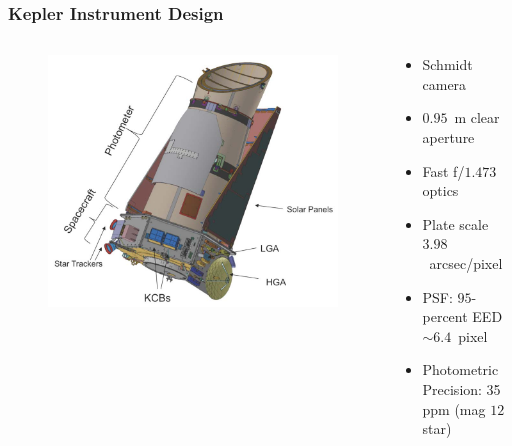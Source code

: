 \documentclass[hyperref={pdfpagelabels=false}]{beamer}
\begin{document}
\begin{frame}
\frametitle{Kepler Instrument Design}
  \begin{columns}
    \begin{column}{0.6\textwidth}
      \begin{center}
        \centering
        \begin{figure}
          \includegraphics[scale=0.5]{images/Kepler_Spacecraft.jpg}
        \end{figure}
      \end{center}
    \end{column}
    \begin{column}{0.4\textwidth}
      \begin{itemize}
        \item Schmidt camera
        \item $0.95$~m clear aperture
        \item Fast f/$1.473$ optics
        \item Plate scale $3.98$~arcsec/pixel
        \item PSF: $95$-percent EED $\sim 6.4$~pixel
        \item Photometric Precision: 35 ppm (mag $12$ star)
      \end{itemize}
    \end{column}
  \end{columns}
\end{frame}
\end{document}
